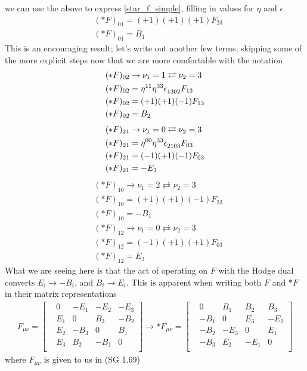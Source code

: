 %
we can use the above to express \ref{star_f_simple}, filling in values for $\eta$ and $\epsilon$
%
\begin{align}
	&(\ast F)_{0 1} = (+1) (+1) (+1) F_{23}\\
	&(\ast F)_{0 1} = B_1
\end{align}
%
This is an encouraging result; let's write out another few terms, skipping some of the more explicit steps now that we are more comfortable with the notation
%
\begin{align}
	&(\ast F)_{0 2} \rightarrow \nu_1 = 1 \rightleftarrows \nu_2 = 3 \\
	&(\ast F)_{0 2} = \eta\indices{^{11}}  \eta\indices{^{33}} \epsilon\indices{_{1302}} F_{13} \\
	&(\ast F)_{0 2} = (+1) (+1) (-1) F_{13} \\
	&(\ast F)_{0 2} = B_2
\end{align}
%
\begin{align}
	&(\ast F)_{2 1} \rightarrow \nu_1 = 0 \rightleftarrows \nu_2 = 3 \\
	&(\ast F)_{2 1} = \eta\indices{^{00}}  \eta\indices{^{33}} \epsilon\indices{_{2103}} F_{03} \\
	&(\ast F)_{2 1} = (-1) (+1) (-1) F_{03} \\
	&(\ast F)_{2 1} = -E_3
\end{align}
%
\begin{align}
	&(\ast F)_{1 0} \rightarrow \nu_1 = 2 \rightleftarrows \nu_2 = 3 \\
	&(\ast F)_{1 0} = (+1) (+1) (-1) F_{23} \\
	&(\ast F)_{1 0} = -B_1
\end{align}
%
\begin{align}
	&(\ast F)_{1 2} \rightarrow \nu_1 = 0 \rightleftarrows \nu_2 = 3 \\
	&(\ast F)_{1 2} = (-1) (+1) (+1) F_{03} \\
	&(\ast F)_{1 2} = E_3
\end{align}
%
What we are seeing here is that the act of operating on $F$ with the Hodge dual converts $E_i \rightarrow -B_i$, and $B_i \rightarrow E_i$. This is apparent when writing both $F$ and $\ast F$ in their matrix representations
%
\begin{align}
	F_{\mu\nu} = \begin{bmatrix}
		&0   &-E_1 &-E_2 &-E_3 \\ 
		&E_1 &0    &B_3  &-B_2 \\
		&E_2 &-B_3 &0    &B_1  \\
		&E_3 &B_2  &-B_1 &0    \\
	\end{bmatrix} 
	\rightarrow
	\ast F_{\mu\nu} = \begin{bmatrix}
	&0   &B_1 &B_2 &B_3 \\ 
	&-B_1 &0    &E_3  &-E_2 \\
	&-B_2 &-E_3 &0    &E_1  \\
	&-B_3 &E_2  &-E_1 &0    \\
	\end{bmatrix}
\end{align}	
%
where $F_{\mu\nu}$ is given to us in (SG 1.69)

